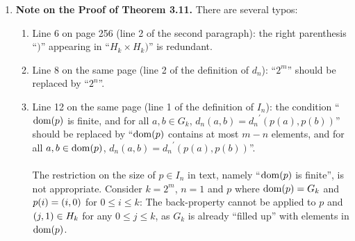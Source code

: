 \begin{enumerate}[1.]
\begin{claim}
Let $S$ be a relational symbol set and $\struct{A}$ and $\struct{B}$ be $S$-structures. Then
\begin{enumerate}[\rm (a)]
\item $\struct{A} \finiso \struct{B}$ \ \ \ iff \ \ \ $\struct{A} \iso_m \struct{B}$ for $m \in \nat$;
\item $\struct{A} \equiv \struct{B}$ \ \ \ iff \ \ \ $\struct{A} \equiv_m \struct{B}$ for $m > 0$.
\end{enumerate}
\end{claim}
\begin{proof}
For (a), if $\seqi{I_n}{n \in \nat} : \struct{A} \finiso \struct{B}$ and $m \in \nat$, then $\seqi{I_n}{n \leq m} : \struct{A} \iso_m \struct{B}$. Conversely, if $\seqi{I^\prime_{m, n}}{n \leq m} : \struct{A} \iso_m \struct{B}$ for $m \in \nat$, then $\seqi{I^\prime_n}{n \in \nat} : \struct{A} \finiso \struct{B}$ where $I^\prime_n \defas \bunion_{m \geq n} I^\prime_{m, n}$.
\medskip\\
For (b) the equivalnece is obvious because the quantifier rank of any $S$-sentence is a positive integer.
\end{proof}
%
\item \textbf{Note on the Proof of Theorem 3.11.} There are several typos:
\begin{enumerate}[(1)]
\item Line 6 on page 256 (line 2 of the second paragraph): the right parenthesis ``$)$'' appearing in ``$H_k \times H_k)$'' is redundant.
\item Line 8 on the same page (line 2 of the definition of $d_n$): ``$2^m$'' should be replaced by ``$2^n$''.
\item Line 12 on the same page (line 1 of the definition of $I_n$): the condition ``${\mathrm{dom}(p)}$ is finite, and for all $a, b \in G_k$, $d_n(a, b) = {d_n}^\prime(p(a), p(b))$'' should be replaced by ``${\mathrm{dom}(p)}$ contains at most $m - n$ elements, and for all $a, b \in {\mathrm{dom}(p)}$, $d_n(a, b) = {d_n}^\prime(p(a), p(b))$''.\\
\ \\
The restriction on the size of $p \in I_n$ in text, namely ``${\mathrm{dom}(p)}$ is finite'', is not appropriate. Consider $k = 2^m$, $n = 1$ and $p$ where ${\mathrm{dom}(p)} = G_k$ and $p(i) = (i, 0)$ for $0 \leq i \leq k$: The back-property cannot be applied to $p$ and $(j, 1) \in H_k$ for any $0 \leq j \leq k$, as $G_k$ is already ``filled up'' with elements in ${\mathrm{dom}(p)}$.\\

\end{enumerate}
\end{enumerate}
